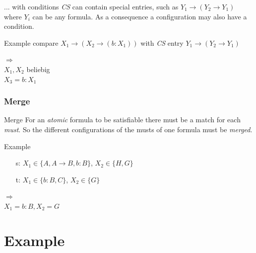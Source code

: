 \documentclass{beamer}
\begin{document}
\begin{frame}{... with conditions}
	\emph{CS} can contain special entries, such as $Y_1\rightarrow (Y_2\rightarrow Y_1)$ where $Y_i$ can be any formula. As a consequence a configuration may also have a condition.
	
	\begin{block}{Example}
	compare $X_1\rightarrow (X_2\rightarrow (b:X_1))$ with \emph{CS} entry $Y_1\rightarrow (Y_2\rightarrow Y_1)$
	\vspace{0.5cm}
	
	$\Rightarrow$\\ 
	$X_1, X_2$ beliebig\\
	$X_3 = b:X_1$
	\end{block}
\end{frame}

\subsubsection{Merge}
\begin{frame}{Merge}
	For an \emph{atomic} formula to be satisfiable there must be a match for each \emph{must}. So the different configurations of the musts of one formula must be \emph{merged}.
	\begin{block}{Example}
	\begin{itemize}
	\item[s:]$X_1 \in \{A, A \rightarrow B, b:B\}$, 	$X_2 \in \{H, G\}$
	\item[t:]$X_1 \in \{b:B, C\}$, $X_2 \in \{G\}$
	\end{itemize}
	$\Rightarrow$ \\
	$ X_1 = b:B, X_2 = G$
	\end{block}
\end{frame}

\section{Example}
\end{document}
